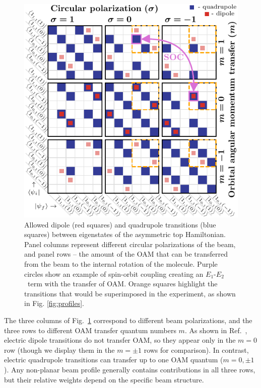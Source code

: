 \documentclass[reprint,aps,prl,twocolumn,superscriptaddress,groupedaddress]{revtex4-2}
\newcommand{\eoet}{$E_1$-$E_2$}
\begin{document}
\begin{figure}[ht!]
    \centering
    \includegraphics[width=\linewidth]{Figure1.pdf}
    \caption{Allowed dipole (red squares) and quadrupole transitions (blue squares) between eigenstates of the asymmetric top Hamiltonian. Panel columns represent different circular polarizations of the beam, and panel rows -- the amount of the OAM that can be transferred from the beam to the internal rotation of the molecule. Purple circles show an example of spin-orbit coupling creating an \eoet ~term with the transfer of OAM. Orange squares highlight the transitions that would be superimposed in the experiment, as shown in Fig. \ref{fig:profiles}.}
    \label{fig:gridJ1}
\end{figure}

The three columns of Fig.~\ref{fig:gridJ1} correspond to different beam polarizations, and the three rows to different OAM transfer quantum numbers $m$. As shown in Ref.~\cite{Maslov2024,Maslov_Thesis}, electric dipole transitions do not transfer OAM, so they appear only in the $m=0$ row (though we display them in the $m=\pm 1$ rows for comparison). In contrast, electric quadrupole transitions can transfer up to one OAM quantum ($m=0,\pm 1$). Any non-planar beam profile generally contains contributions in all three rows, but their relative weights depend on the specific beam structure.
\end{document}
